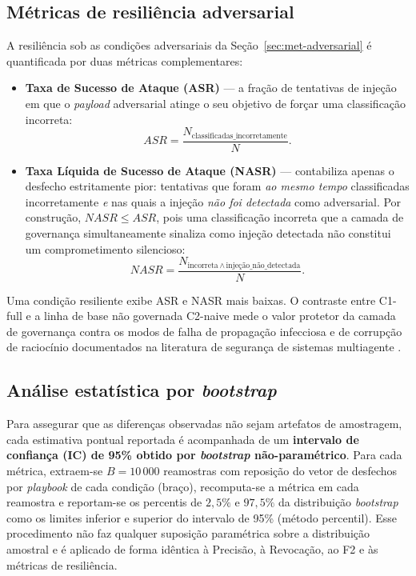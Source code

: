 \subsection{Métricas de resiliência adversarial}

A resiliência sob as condições adversariais da Seção~\ref{sec:met-adversarial} é
quantificada por duas métricas complementares:

\begin{itemize}
    \item \textbf{Taxa de Sucesso de Ataque (ASR)} --- a fração de tentativas de
    injeção em que o \textit{payload} adversarial atinge o seu objetivo de forçar
    uma classificação incorreta:
    \begin{equation}
    \mathit{ASR} = \frac{N_{\text{classificadas\_incorretamente}}}{N}.
    \label{eq:met-asr}
    \end{equation}
    \item \textbf{Taxa Líquida de Sucesso de Ataque (NASR)} --- contabiliza
    apenas o desfecho estritamente pior: tentativas que foram \emph{ao mesmo
    tempo} classificadas incorretamente \emph{e} nas quais a injeção
    \emph{não foi detectada} como adversarial. Por construção,
    $\mathit{NASR} \leq \mathit{ASR}$, pois uma classificação incorreta que a
    camada de governança simultaneamente sinaliza como injeção detectada não
    constitui um comprometimento silencioso:
    \begin{equation}
    \mathit{NASR} =
    \frac{N_{\text{incorreta}\,\wedge\,\text{injeção\_não\_detectada}}}{N}.
    \label{eq:met-nasr}
    \end{equation}
\end{itemize}

Uma condição resiliente exibe ASR e NASR mais baixas. O contraste entre C1-full e
a linha de base não governada C2-naive mede o valor protetor da camada de
governança contra os modos de falha de propagação infecciosa e de corrupção de
raciocínio documentados na literatura de segurança de sistemas multiagente
\cite{huang2024resilience}.

\subsection{Análise estatística por \textit{bootstrap}}

Para assegurar que as diferenças observadas não sejam artefatos de amostragem,
cada estimativa pontual reportada é acompanhada de um \textbf{intervalo de
confiança (IC) de 95\% obtido por \textit{bootstrap} não-paramétrico}. Para cada
métrica, extraem-se $B = 10\,000$ reamostras com reposição do vetor de desfechos
por \textit{playbook} de cada condição (braço), recomputa-se a métrica em cada
reamostra e reportam-se os percentis de $2{,}5\%$ e $97{,}5\%$ da distribuição
\textit{bootstrap} como os limites inferior e superior do intervalo de 95\%
(método percentil). Esse procedimento não faz qualquer suposição paramétrica
sobre a distribuição amostral e é aplicado de forma idêntica à Precisão, à
Revocação, ao F2 e às métricas de resiliência.

